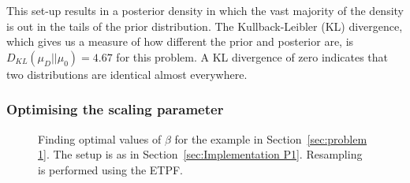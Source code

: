 \documentclass[final]{siamltex}
\begin{document}
This set-up results in a posterior density in which the vast majority
of the density is out in the tails of the
prior distribution. The Kullback-Leibler (KL)
divergence, which gives us a measure of how different the prior and
posterior are, is $D_{KL}(\mu_D || \mu_0) = 4.67$ for this
problem. A KL divergence of zero indicates that two distributions are
identical almost everywhere.


\subsubsection{Optimising the scaling parameter}\label{sec:Optimal values P1}

\begin{figure}[htb]
\centering
{}
\caption{Finding optimal values of $\beta$ for the example in Section~\ref{sec:problem 1}. The setup is as in Section~\ref{sec:Implementation P1}. Resampling is performed using the ETPF.}
\label{fig:P1 opt beta}
\end{figure}
\end{document}
